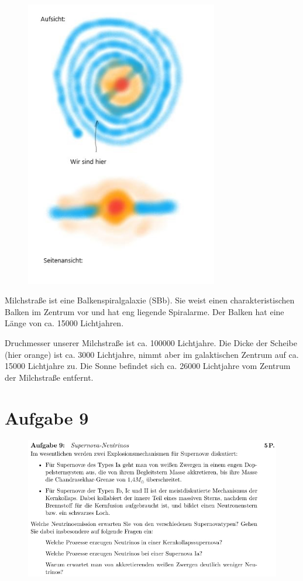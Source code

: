 \begin{figure}[H]
    \centering
    \includegraphics[width=0.75\textwidth]{images/Aufgabe8c_skizze.jpg}
    \label{fig:5}
\end{figure}

    \justifying Milchstraße ist eine Balkenspiralgalaxie (SBb). Sie weist einen charakteristischen Balken im Zentrum vor und hat eng
    liegende Spiralarme. Der Balken hat eine Länge von ca. 15000 Lichtjahren.

    \justifying Druchmesser unserer Milchstraße ist ca. 100000 Lichtjahre. Die Dicke der Scheibe (hier orange) ist ca. 3000
    Lichtjahre, nimmt aber im galaktischen Zentrum auf ca. 15000 Lichtjahre zu. Die Sonne befindet sich ca. 26000 Lichtjahre vom Zentrum der
    Milchstraße entfernt. 

\section{Aufgabe 9}

\begin{figure}[H]
    \centering
    \includegraphics[width=\textwidth]{images/Aufgabe9.jpg}
    \label{fig:6}
\end{figure}




